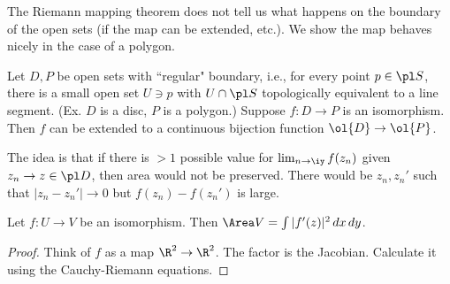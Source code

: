 The Riemann mapping theorem does not tell us what happens on the boundary of the open sets (if the map can be extended, etc.). We show the map behaves nicely in the case of a polygon.

\begin{thm}
Let $D,P$ be open sets with ``regular" boundary, i.e., for every point $p\in \pl S$, there is a small open set $U\ni p$ with $U\cap \pl S$ topologically equivalent to a line segment. (Ex. $D$ is a disc, $P$ is a polygon.)
Suppose $f:D\to P$  is an isomorphism. Then $f$ can be extended to a continuous bijection function $\ol{D}\to \ol{P}$.
\end{thm}
The idea is that if there is $>1$ possible value for $\lim_{n\to \iy} f(z_n)$ given $z_n\to z\in \pl D$, then area would not be preserved. There would be $z_n,z_n'$ such that $|z_n-z_n'|\to 0$ but $f(z_n)-f(z_n')$ is large.

\begin{lem}
Let $f:U\to V$ be an isomorphism. Then $\Area V = \int |f'(z)|^2\,dx\,dy$.
\end{lem}
\begin{proof}
Think of $f$ as a map $\R^2\to \R^2$. The factor is the Jacobian. Calculate it using the Cauchy-Riemann equations.
\end{proof}

